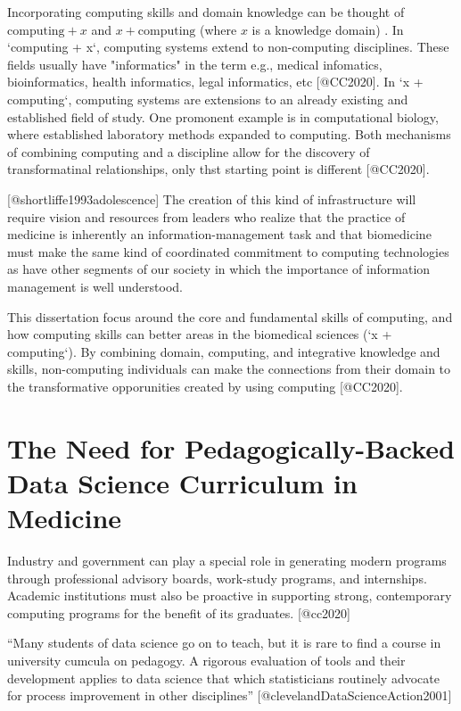 \documentclass[../main.tex]{subfiles}
\begin{document}
        Incorporating computing skills and domain knowledge can be thought of
        $\text{computing} + x$ and $x + \text{computing}$ (where $x$ is a knowledge domain)
        \cite{cc2020}.
        In `computing + x`, computing systems extend to non-computing disciplines.
        These fields usually have "informatics" in the term
        e.g., medical infomatics, bioinformatics, health informatics, legal informatics, etc [@CC2020].
        In `x + computing`,
        computing systems are extensions to an already existing and established field of study.
        One promonent example is in computational biology,
        where established laboratory methods expanded to computing.
        Both mechanisms of combining computing and a discipline allow for the discovery of transformatinal relationships,
        only thst starting point is different [@CC2020].

        [@shortliffe1993adolescence]
        The creation of this kind of infrastructure will require vision and resources from leaders who realize that the practice of medicine is inherently an information-management task and that biomedicine must make the same kind of coordinated commitment to computing technologies as have other segments of our society in which the importance of information management is well understood.

        This dissertation focus around the core and fundamental skills
        of computing, and how computing skills can better areas in the biomedical sciences (`x + computing`).
        By combining domain, computing, and integrative knowledge and skills,
        non-computing individuals can make the connections from their domain to the transformative opporunities
        created by using computing [@CC2020].

    \section{The Need for Pedagogically-Backed Data Science Curriculum in Medicine}
        \label{se:intro-ds-edu-gaps}

        Industry and government can play a special role in generating modern programs through
        professional advisory boards, work-study programs, and internships.
        Academic institutions must also be proactive in
        supporting strong, contemporary computing programs for the benefit of its graduates. [@cc2020]

        ``Many students of data science
        go on to teach, but it is rare to find a course in university cumcula on pedagogy.
        A
        rigorous evaluation
        of tools and their development applies to data science that which statisticians routinely advocate for
        process improvement in other disciplines'' [@clevelandDataScienceAction2001]
\end{document}
